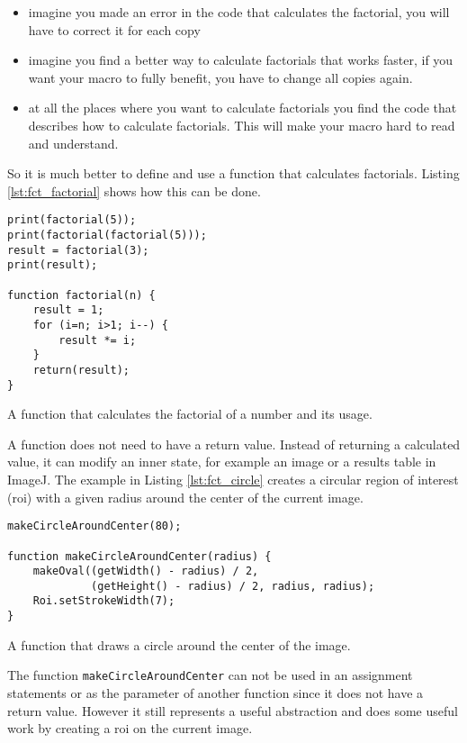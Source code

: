 \begin{itemize}
\item imagine you made an error in the code that calculates the factorial, you will have to correct it for each copy
\item imagine you find a better way to calculate factorials that works faster, if you want your macro to fully benefit, you have to change all copies again.
\item at all the places where you want to calculate factorials you find the code that describes how to calculate factorials. This will make your macro hard to read and understand. 
\end{itemize}

So it is much better to define and use a function that calculates factorials. Listing \ref{lst:fct_factorial} shows how this can be done.

\begin{listing}[H]
\begin{verbatim}
print(factorial(5));	
print(factorial(factorial(5)));
result = factorial(3);
print(result);

function factorial(n) {
	result = 1;
	for (i=n; i>1; i--) {
		result *= i;
	}
	return(result);
}
\end{verbatim}
\caption{A function that calculates the factorial of a number and its usage.}
\label{lst:fct_factorial}
\end{listing}

A function does not need to have a return value. Instead of returning a calculated value, it can modify an inner state, for example an image or a results table in ImageJ. The example in Listing \ref{lst:fct_circle} creates a circular region of interest (roi) with a given radius around the center of the current image.

\begin{listing}[H]
\begin{verbatim}
makeCircleAroundCenter(80);

function makeCircleAroundCenter(radius) {
	makeOval((getWidth() - radius) / 2, 
		     (getHeight() - radius) / 2, radius, radius);
	Roi.setStrokeWidth(7);
}
\end{verbatim}
\caption{A function that draws a circle around the center of the image.}
\label{lst:circle}
\end{listing}

The function {\tt makeCircleAroundCenter} can not be used in an assignment statements or as the parameter of another function since it does not have a return value. However it still represents a useful abstraction and does some useful work by creating a roi on the current image.

